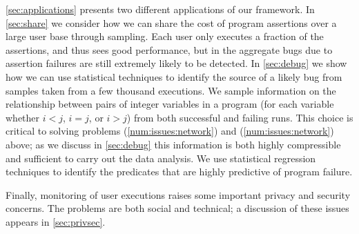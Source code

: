 \autoref{sec:applications} presents two different applications of our
framework.  In \autoref{sec:share} we consider how we can share the
cost of program assertions over a large user base through sampling.
Each user only executes a fraction of the assertions, and thus sees
good performance, but in the aggregate bugs due to assertion failures
are still extremely likely to be detected.  In \autoref{sec:debug} we
show how we can use statistical techniques to identify the source of a
likely bug from samples taken from a few thousand executions.  We
sample information on the relationship between pairs of integer
variables in a program (for each variable whether $i < j$, $i = j$, or
$i > j$) from both successful and failing runs.  This choice is
critical to solving problems (\ref{num:issues:network}) and
(\ref{num:issues:network}) above; as we discuss in \autoref{sec:debug}
this information is both highly compressible and sufficient to carry
out the data analysis.  We use statistical regression techniques to
identify the predicates that are highly predictive of program failure.

Finally, monitoring of user executions raises some important privacy
and security concerns.  The problems are both social and technical; a
discussion of these issues appears in \autoref{sec:privsec}.


